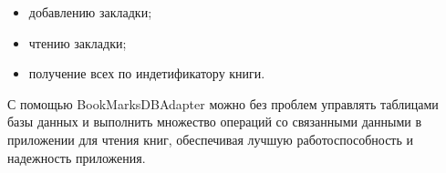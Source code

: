 \begin{itemize}
	\item добавлению закладки;
	\item чтению закладки;
	\item получение всех по индетификатору книги. 
\end{itemize}

С помощью BookMarksDBAdapter можно без проблем управлять таблицами
базы данных и выполнить множество операций со связанными данными
в приложении для чтения книг, обеспечивая лучшую работоспособность
и надежность приложения.

